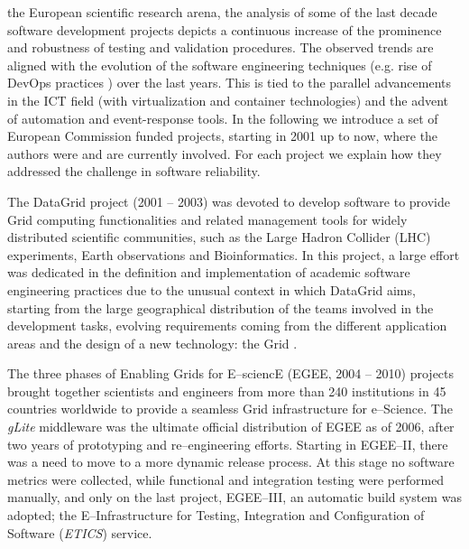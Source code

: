 \documentclass[journal]{IEEEtran}
\begin{document}
 the European scientific research arena, the analysis of some of the last decade software development projects depicts a continuous increase of the prominence and robustness of testing and validation procedures. The observed trends are aligned with the evolution of the software engineering techniques (e.g. rise of DevOps practices \cite{devops}) over the last years. This is tied to the parallel advancements in the ICT field (with virtualization and container technologies) and the advent of automation and event-response tools. In the following we introduce a set of European Commission funded projects, starting in 2001 up to now, where the authors were and are currently involved. For each project we explain how they addressed the challenge in software reliability.

The DataGrid \cite{cordis:datagrid} project (2001 -- 2003) was devoted to develop software to provide Grid computing functionalities and related management tools for widely distributed scientific communities, such as the Large Hadron Collider (LHC) experiments, Earth observations and Bioinformatics. In this project, a large effort was dedicated in the definition and implementation of academic software engineering practices due to the unusual context in which DataGrid aims, starting from the large geographical distribution of the teams involved in the development tasks, evolving requirements coming from the different application areas and the design of a new technology: the Grid \cite{datagrid}.

The three phases of Enabling Grids for E--sciencE (EGEE, 2004 -- 2010) \cite{cordis:egee} projects brought together scientists and engineers from more than 240 institutions in 45 countries worldwide to provide a seamless Grid infrastructure for e--Science. The {\sl gLite} middleware \cite{glite} was the ultimate official distribution of EGEE as of 2006, after two years of prototyping and re--engineering efforts. Starting in EGEE--II, there was a need to move to a more dynamic release process. At this stage no software metrics were collected, while functional and integration testing were performed manually, and only on the last project, EGEE--III, an automatic build system was adopted; the E--Infrastructure for Testing, Integration and Configuration of Software ({\sl ETICS}) service.
\end{document}

